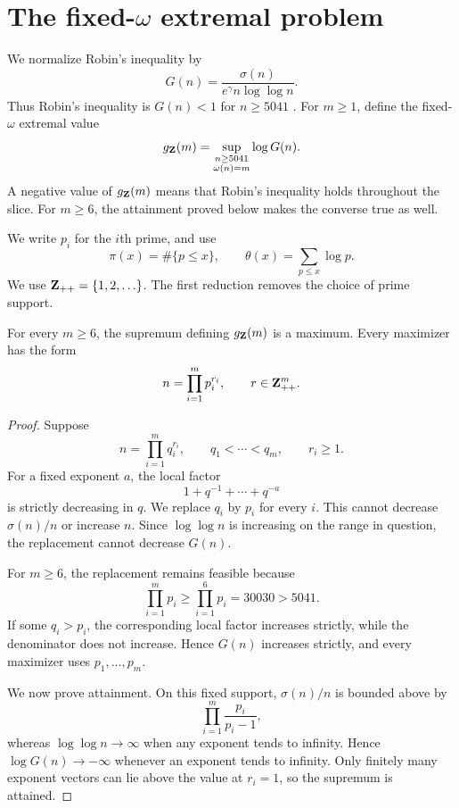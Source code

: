 \section{The fixed-\texorpdfstring{\(\omega\)}{omega} extremal problem}
\label{s-fixed-slice}

We normalize Robin's inequality by
\[
    G(n)
    =
    \frac{\sigma(n)}
    {e^\gamma n\log\log n}.
\]
Thus Robin's inequality is \(G(n)<1\) for \(n\geq5041\)
\cite{robin1984}. For \(m\geq1\), define the fixed-\(\omega\) extremal
value
\[
    g_{\mathbf{Z}}(m)
    =
    \sup_{\substack{n\geq5041\\ \omega(n)=m}}\log G(n).
\]
A negative value of \(g_{\mathbf{Z}}(m)\) means that Robin's inequality
holds throughout the slice. For \(m\geq6\), the attainment proved below
makes the converse true as well.

We write \(p_i\) for the \(i\)th prime, and use
\[
    \pi(x)=\#\{p\leq x\},
    \qquad
    \theta(x)=\sum_{p\leq x}\log p.
\]
We use \(\mathbf{Z}_{++}=\{1,2,\ldots\}\).
The first reduction removes the choice of prime support.

\begin{proposition}
\label{prop-support}
For every \(m\geq6\), the supremum defining
\(g_{\mathbf{Z}}(m)\) is a maximum. Every maximizer has the form
\[
    n=\prod_{i=1}^{m}p_i^{r_i},
    \qquad
    r\in\mathbf{Z}_{++}^{m}.
\]
\end{proposition}

\begin{proof}
Suppose
\[
    n=\prod_{i=1}^{m}q_i^{r_i},
    \qquad
    q_1<\cdots<q_m,
    \qquad
    r_i\geq1.
\]
For a fixed exponent \(a\), the local factor
\[
    1+q^{-1}+\cdots+q^{-a}
\]
is strictly decreasing in \(q\). We replace \(q_i\) by \(p_i\) for every
\(i\). This cannot decrease \(\sigma(n)/n\) or increase \(n\). Since
\(\log\log n\) is increasing on the range in question, the replacement
cannot decrease \(G(n)\).

For \(m\geq6\), the replacement remains feasible because
\[
    \prod_{i=1}^{m}p_i
    \geq
    \prod_{i=1}^{6}p_i
    =
    30030
    >
    5041.
\]
If some \(q_i>p_i\), the corresponding local factor increases strictly,
while the denominator does not increase. Hence \(G(n)\) increases
strictly, and every maximizer uses \(p_1,\ldots,p_m\).

We now prove attainment. On this fixed support,
\(\sigma(n)/n\) is bounded above by
\[
    \prod_{i=1}^{m}\frac{p_i}{p_i-1},
\]
whereas \(\log\log n\to\infty\) when any exponent tends to infinity.
Hence \(\log G(n)\to-\infty\) whenever an exponent tends to infinity.
Only finitely many exponent vectors can
lie above the value at \(r_i=1\), so the supremum is attained.
\end{proof}


